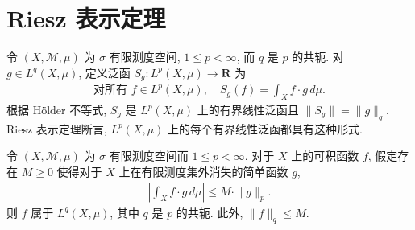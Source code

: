 \documentclass[../../main.tex]{subfiles}
\begin{document}
\section{Riesz 表示定理}\label{section:ch19-riesz-representation}

令 $(X,\mathcal{M},\mu)$ 为 $\sigma$ 有限测度空间, $1\leqslant p<\infty$, 而 $q$ 是 $p$ 的共轭. 对 $g\in L^{q}(X,\mu)$, 定义泛函 $S_{g}:L^{p}(X,\mu)\to\mathbf{R}$ 为
\begin{align*}
\text{对所有 }f\in L^{p}(X,\mu),\quad S_{g}(f)=\int_{X}f\cdot g\,d\mu.
\end{align*}
根据 H\"older 不等式, $S_{g}$ 是 $L^{p}(X,\mu)$ 上的有界线性泛函且 $\|S_{g}\|=\|g\|_{q}$. Riesz 表示定理断言, $L^{p}(X,\mu)$ 上的每个有界线性泛函都具有这种形式.

\begin{lemma}\label{lemma:ch19-riesz-helper}
令 $(X,\mathcal{M},\mu)$ 为 $\sigma$ 有限测度空间而 $1\leqslant p<\infty$. 对于 $X$ 上的可积函数 $f$, 假定存在 $M\geqslant 0$ 使得对于 $X$ 上在有限测度集外消失的简单函数 $g$,
\begin{align}
\left|\int_{X}f\cdot g\,d\mu\right|\leqslant M\cdot\|g\|_{p}.\label{align:ch19-lemma}
\end{align}
则 $f$ 属于 $L^{q}(X,\mu)$, 其中 $q$ 是 $p$ 的共轭. 此外, $\|f\|_{q}\leqslant M$.
\end{lemma}
\end{document}
